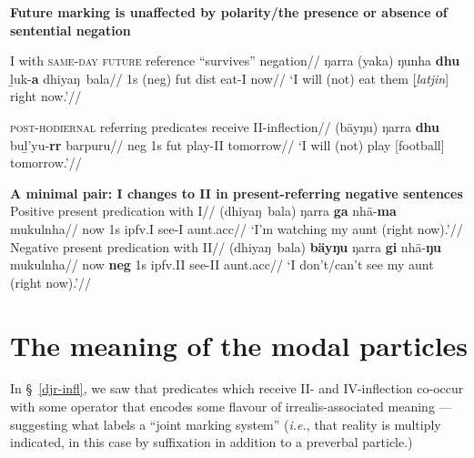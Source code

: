 \pex \textbf{Future marking is unaffected by polarity/the presence or absence of sentential negation}	\par\nobreak
\a\begingl\glpreamble \gls{I} with \textsc{same-day future} reference ``survives'' negation//
\gla ŋarra (yaka) ŋunha \textbf{dhu} ḻuk-\textbf{a} dhiyaŋ~bala//
\glb 1s (\gls{neg}) \gls{fut} \gls{dist} eat-\gls{I} now//
\glft`I will (not) eat them [\textit{ḻatjin}] right now.'\trailingcitation{[AW~20190422]}//\endgl

\a\begingl\glpreamble \textsc{post-hodiernal} referring predicates receive \gls{II}-inflection//
\gla (bäyŋu) ŋarra \textbf{dhu} buḻ'yu-\textbf{rr} barpuru//
\glb \gls{neg} 1s \gls{fut} play-\gls{II} tomorrow//
\glft`I will (not) play [football] tomorrow.'\trailingcitation{[AW~20190429]}//\endgl
\xe

\pex \textbf{A minimal pair: \gls{I} changes to \gls{II} in present-referring negative sentences}
\a\begingl\glpreamble Positive present predication with \gls{I}//
\gla (dhiyaŋ~bala)  ŋarra \textbf{ga} nhä-\textbf{ma} mukulnha//
\glb now 1s \gls{ipfv}.\gls{I} see-\gls{I} aunt.\gls{acc}//
\glft`I'm watching my aunt (right now).'//
\endgl
\a\begingl\glpreamble Negative present predication with \gls{II}//
\gla (dhiyaŋ~bala) \textbf{bäyŋu} ŋarra \textbf{gi} nhä-\textbf{ŋu} mukulnha//
\glb now \textbf{\gls{neg}} 1s \gls{ipfv}.\gls{II} see-\gls{II} aunt.\gls{acc}//
\glft`I don't/can't see my aunt (right now).'\trailingcitation{[AW~20190501]}//\endgl
\xe


\section{The meaning of the modal particles}
\label{sec:modals}
In \S~\ref{djr-infl}, we saw that predicates which receive \gls{II}- and \gls{IV}-inflection co-occur with some operator that encodes some flavour of irrealis-associated meaning --- suggesting what \citet[145]{Palmer2001} labels a ``joint marking system'' (\textit{i.e.}, that reality is multiply indicated, in this case by suffixation in addition to a preverbal particle.) 

